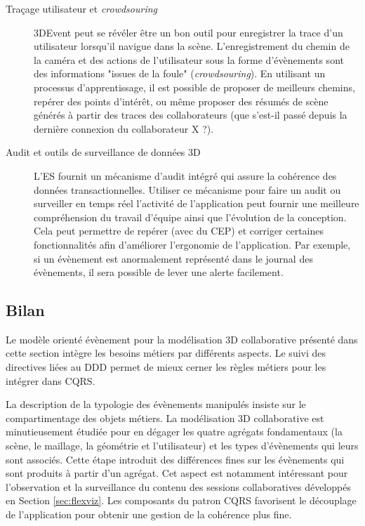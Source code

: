 \begin{description}
	\item[Traçage utilisateur et \textit{crowdsouring}] 3DEvent peut se révéler être 
	un bon outil pour enregistrer la trace d'un utilisateur lorsqu'il navigue dans la 
	scène. L'enregistrement du chemin de la caméra et des actions de l'utilisateur sous la forme d'évènements sont des informations 
	"issues de la foule" (\textit{crowdsouring}). En utilisant un processus 
	d'apprentissage, il est possible de proposer de meilleurs chemins, repérer des 
	points d'intérêt, ou même proposer des résumés de scène générés à partir des 
	traces des collaborateurs (que s'est-il passé depuis la dernière connexion du 
	collaborateur X ?).
	\item[Audit et outils de surveillance de données 3D] L'\gls{ES} fournit un 
	mécanisme 
	d'audit intégré qui assure la cohérence des données transactionnelles. Utiliser 
	ce mécanisme pour faire un audit ou surveiller en temps réel l'activité de 
	l'application peut fournir une meilleure compréhension du travail d'équipe ainsi 
	que l'évolution de la conception. Cela peut permettre de repérer (avec du 
	\gls{CEP}) et corriger certaines fonctionnalités afin d'améliorer l'ergonomie de 
	l'application. Par exemple, si un évènement est anormalement représenté dans 
	le journal des évènements, il sera possible de lever une alerte facilement.
\end{description}
\subsection{Bilan}

Le modèle orienté évènement pour la modélisation 3D collaborative présenté dans 
cette section intègre les besoins métiers par différents aspects. Le suivi des 
directives liées au \gls{DDD} permet de mieux cerner les règles 
métiers pour les intégrer dans \gls{CQRS}. 

La description de la typologie des 
évènements manipulés insiste sur le compartimentage des objets métiers. La 
modélisation 3D collaborative est minutieusement étudiée pour en dégager les quatre 
agrégats fondamentaux (la scène, le maillage, la géométrie et l'utilisateur) et les 
types d'évènements qui leurs sont associés. Cette étape introduit des différences 
fines sur les évènements qui sont produits à partir d'un agrégat. 
Cet aspect est notamment intéressant pour l'observation et la surveillance du 
contenu des sessions collaboratives développés en Section 
\ref{sec:flexviz}. 
Les composants du patron \gls{CQRS} favorisent le découplage de l'application 
pour obtenir une gestion de la cohérence plus fine. 

